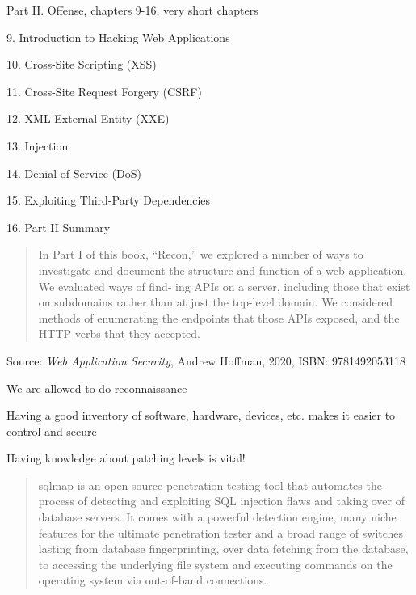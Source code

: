 \documentclass[Screen16to9,17pt]{foils}
\begin{document}
\begin{list1}
\item Part II. Offense, chapters 9-16, very short chapters
\item 9. Introduction to Hacking Web Applications
\item 10. Cross-Site Scripting (XSS)
\item 11. Cross-Site Request Forgery (CSRF)
\item 12. XML External Entity (XXE)
\item 13. Injection
\item 14. Denial of Service (DoS)
\item 15. Exploiting Third-Party Dependencies
\item 16. Part II Summary
\end{list1}



\begin{quote}
  In Part I of this book, “Recon,” we explored a number of ways to investigate and
  document the structure and function of a web application. We evaluated ways of find‐
  ing APIs on a server, including those that exist on subdomains rather than at just the
  top-level domain. We considered methods of enumerating the endpoints that those
  APIs exposed, and the HTTP verbs that they accepted.
\end{quote}
Source: \emph{Web Application Security}, Andrew Hoffman, 2020, ISBN: 9781492053118


\begin{list2}
\item We are allowed to do reconnaissance
\item Having a good inventory of software, hardware, devices, etc. makes it easier to control and secure
\item Having knowledge about patching levels is vital!
\end{list2}




\begin{quote}\small
sqlmap is an open source penetration testing tool that automates the process of detecting and exploiting SQL injection flaws and taking over of database servers. It comes with a powerful detection engine, many niche features for the ultimate penetration tester and a broad range of switches lasting from database fingerprinting, over data fetching from the database, to accessing the underlying file system and executing commands on the operating system via out-of-band connections.

\end{quote}
\end{document}
